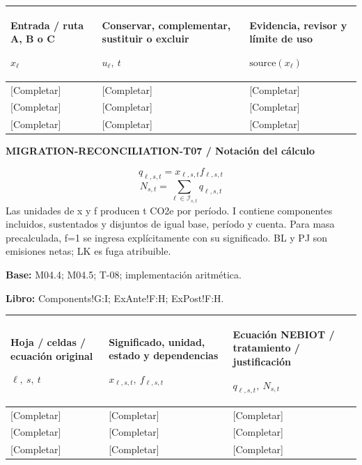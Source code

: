 {\sffamily\fontsize{8.3}{10.3}\selectfont\begin{longtable}{@{}P{54.83mm} P{54.83mm} P{54.83mm}@{}}
\toprule
\textbf{Entrada / ruta A, B o C}\par {\normalfont\fontsize{8.2}{10}\selectfont $x_{\ell}$} & \textbf{Conservar, complementar, sustituir o excluir}\par {\normalfont\fontsize{8.2}{10}\selectfont $u_{\ell},\ t$} & \textbf{Evidencia, revisor y límite de uso}\par {\normalfont\fontsize{8.2}{10}\selectfont $\text{source}(x_{\ell})$}\\\midrule\endhead
\rule{0pt}{8mm}[Completar] & [Completar] & [Completar]\\\hline
\rule{0pt}{8mm}[Completar] & [Completar] & [Completar]\\\hline
\rule{0pt}{8mm}[Completar] & [Completar] & [Completar]\\\hline
\end{longtable}}
\par\begingroup\sffamily\fontsize{8}{10}\selectfont\color{NEBGreen}\setlength{\parskip}{2pt}\setlength{\abovedisplayskip}{4pt}\setlength{\belowdisplayskip}{4pt}\setlength{\abovedisplayshortskip}{2pt}\setlength{\belowdisplayshortskip}{3pt}
\textbf{MIGRATION-RECONCILIATION-T07 / Notación del cálculo}\par
{\fontsize{9}{11}\selectfont\[ q_{\ell,s,t}=x_{\ell,s,t}f_{\ell,s,t} \]}
{\fontsize{9}{11}\selectfont\[ N_{s,t}=\sum_{\ell\in\mathcal I_{s,t}}q_{\ell,s,t} \]}
Las unidades de x y f producen t CO2e por período. I contiene componentes incluidos, sustentados y disjuntos de igual base, período y cuenta. Para masa precalculada, f=1 se ingresa explícitamente con su significado. BL y PJ son emisiones netas; LK es fuga atribuible.\par
\textbf{Base:} M04.4; M04.5; T-08; implementación aritmética.\par
\textbf{Libro:} Components!G:I; ExAnte!F:H; ExPost!F:H.\par\endgroup
{\sffamily\fontsize{8.3}{10.3}\selectfont\begin{longtable}{@{}P{54.83mm} P{54.83mm} P{54.83mm}@{}}
\toprule
\textbf{Hoja / celdas / ecuación original}\par {\normalfont\fontsize{8.2}{10}\selectfont $\ell,\ s,\ t$} & \textbf{Significado, unidad, estado y dependencias}\par {\normalfont\fontsize{8.2}{10}\selectfont $x_{\ell,s,t},\ f_{\ell,s,t}$} & \textbf{Ecuación NEBIOT / tratamiento / justificación}\par {\normalfont\fontsize{8.2}{10}\selectfont $q_{\ell,s,t},\ N_{s,t}$}\\\midrule\endhead
\rule{0pt}{8mm}[Completar] & [Completar] & [Completar]\\\hline
\rule{0pt}{8mm}[Completar] & [Completar] & [Completar]\\\hline
\rule{0pt}{8mm}[Completar] & [Completar] & [Completar]\\\hline
\end{longtable}}
